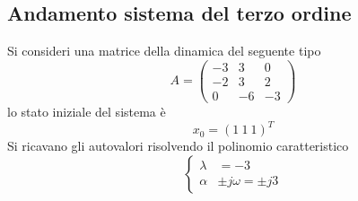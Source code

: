
\subsection{Andamento sistema del terzo ordine}
Si consideri una matrice della dinamica del seguente tipo
$$
A = \begin{pmatrix}
-3 & 3 & 0\\
-2 & 3 & 2\\
0  & -6 & -3
\end{pmatrix}
$$
lo stato iniziale del sistema è
$$
x_0 = (1 \ 1\ 1)^T
$$
Si ricavano gli autovalori risolvendo il polinomio caratteristico
$$
\left\{\begin{aligned}
\lambda &= -3 \\
\alpha &\pm j\omega = \pm j3
\end{aligned}\right.
$$
